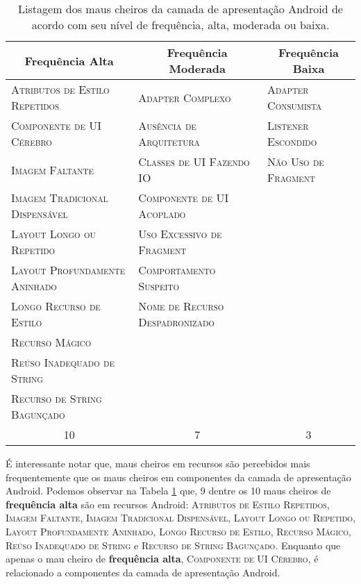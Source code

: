 \begin{table}[!htb]
\centering
\renewcommand*{\arraystretch}{1}
\footnotesize 
\caption{Listagem dos maus cheiros da camada de apresentação Android de acordo com seu nível de frequência, alta, moderada ou baixa.}
\begin{tabular}{@{}p{5.2cm}p{5.2cm}p{5.2cm}@{}}
\toprule
\multicolumn{1}{c}{\textbf{Frequência Alta}} & \multicolumn{1}{c}{\textbf{Frequência Moderada}} & \multicolumn{1}{c}{\textbf{Frequência Baixa}} \\ 
\bottomrule
\textsc{\scriptsize Atributos de Estilo Repetidos}  & \textsc{\scriptsize Adapter Complexo}               & \textsc{\scriptsize Adapter Consumista} \\ 
\textsc{\scriptsize Componente de UI Cérebro}       & \textsc{\scriptsize Ausência de Arquitetura}        & \textsc{\scriptsize Listener Escondido} \\ 
\textsc{\scriptsize Imagem Faltante}                & \textsc{\scriptsize Classes de UI Fazendo IO}       & \textsc{\scriptsize Não Uso de Fragment} \\ 
\textsc{\scriptsize Imagem Tradicional Dispensável} & \textsc{\scriptsize Componente de UI Acoplado}      \\ 
\textsc{\scriptsize Layout Longo ou Repetido}       & \textsc{\scriptsize Uso Excessivo de Fragment}      \\ 
\textsc{\scriptsize Layout Profundamente Aninhado}  & \textsc{\scriptsize Comportamento Suspeito}         \\ 
\textsc{\scriptsize Longo Recurso de Estilo}        & \textsc{\scriptsize Nome de Recurso Despadronizado} \\ 
\textsc{\scriptsize Recurso Mágico}                 \\ 
\textsc{\scriptsize Reúso Inadequado de String}     \\ 
\textsc{\scriptsize Recurso de String Bagunçado}    \\ 
\toprule
\multicolumn{1}{c}{10} & \multicolumn{1}{c}{7} & \multicolumn{1}{c}{3}\\ 
\bottomrule
\end{tabular}
\label{tab:SmellFrequency}
\end{table}

É interessante notar que, maus cheiros em recursos são percebidos mais frequentemente que os maus cheiros em componentes da camada de apresentação Android. Podemos observar na Tabela \ref{tab:SmellFrequency} que, 9 dentre os 10 maus cheiros de \textbf{\small frequência alta} são em recursos Android: \textsc{\small Atributos de Estilo Repetidos}, \textsc{\small Imagem Faltante}, \textsc{\small Imagem Tradicional Dispensável}, \textsc{\small Layout Longo ou Repetido}, \textsc{\small Layout Profundamente Aninhado}, \textsc{\small Longo Recurso de Estilo}, \textsc{\small Recurso Mágico}, \textsc{\small Reúso Inadequado de String} e \textsc{\small Recurso de String Bagunçado}. Enquanto que apenas o mau cheiro de \textbf{\small frequência alta}, \textsc{\small Componente de UI Cérebro}, é relacionado a componentes da camada de apresentação Android.

